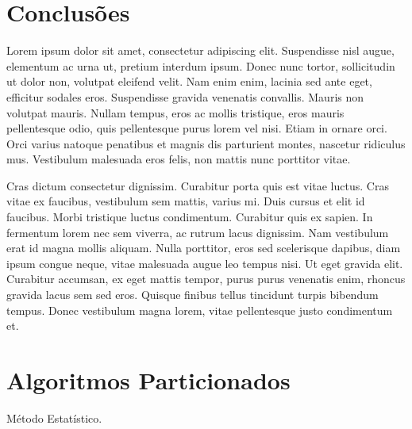 \section{Conclusões}
   Lorem ipsum dolor sit amet, consectetur adipiscing elit. Suspendisse nisl augue, elementum ac urna ut, pretium interdum ipsum. Donec nunc tortor, sollicitudin ut dolor non, volutpat eleifend velit. Nam enim enim, lacinia sed ante eget, efficitur sodales eros. Suspendisse gravida venenatis convallis. Mauris non volutpat mauris. Nullam tempus, eros ac mollis tristique, eros mauris pellentesque odio, quis pellentesque purus lorem vel nisi. Etiam in ornare orci. Orci varius natoque penatibus et magnis dis parturient montes, nascetur ridiculus mus. Vestibulum malesuada eros felis, non mattis nunc porttitor vitae.
   

   Cras dictum consectetur dignissim. Curabitur porta quis est vitae luctus. Cras vitae ex faucibus, vestibulum sem mattis, varius mi. Duis cursus et elit id faucibus. Morbi tristique luctus condimentum. Curabitur quis ex sapien. In fermentum lorem nec sem viverra, ac rutrum lacus dignissim. Nam vestibulum erat id magna mollis aliquam. Nulla porttitor, eros sed scelerisque dapibus, diam ipsum congue neque, vitae malesuada augue leo tempus nisi. Ut eget gravida elit. Curabitur accumsan, ex eget mattis tempor, purus purus venenatis enim, rhoncus gravida lacus sem sed eros. Quisque finibus tellus tincidunt turpis bibendum tempus. Donec vestibulum magna lorem, vitae pellentesque justo condimentum et.

   \section*{Algoritmos Particionados}
    
    \begin{algorithm}[!ht] \footnotesize
        
        \BlankLine
        \caption{Método Estatístico.}
        \label{alg:statistic}
    \end{algorithm}
    
